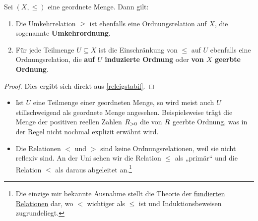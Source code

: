 \begin{satz} \label{umkehrordnung}
    Sei $(X,\le)$ eine geordnete Menge. Dann gilt:
    \begin{enumerate}
        \item Die Umkehrrelation $\ge$ ist ebenfalls eine Ordnungsrelation auf $X$, die sogenannte \textbf{Umkehrordnung}.
        \item Für jede Teilmenge $U\subseteq X$ ist die Einschränkung von $\le$ auf $U$ ebenfalls eine Ordnungsrelation, die \textbf{auf $U$ induzierte Ordnung} oder \textbf{von $X$ geerbte Ordnung}.
    \end{enumerate}
\end{satz}
\begin{proof}
    Dies ergibt sich direkt aus \cref{releigstabil}.
\end{proof}


\begin{bem} \quad
    \begin{itemize}
        \item Ist $U$ eine Teilmenge einer geordneten Menge, so wird meist auch $U$ stillschweigend als geordnete Menge angesehen. Beispielsweise trägt die Menge der positiven reellen Zahlen $\relax R_{>0}$ die von $\relax R$ geerbte Ordnung, was in der Regel nicht nochmal explizit erwähnt wird.
        \item Die Relationen $<$ und $>$ sind keine Ordnungsrelationen, weil sie nicht reflexiv sind. An der Uni sehen wir die Relation $\le$ als „primär“ und die Relation $<$ als daraus abgeleitet an.\footnote{Die einzige mir bekannte Ausnahme stellt die Theorie der \href{https://en.wikipedia.org/wiki/Well-founded_relation}{fundierten Relationen} dar, wo $<$ wichtiger als $\le$ ist und Induktionsbeweisen zugrundeliegt.}
    \end{itemize}
\end{bem}


